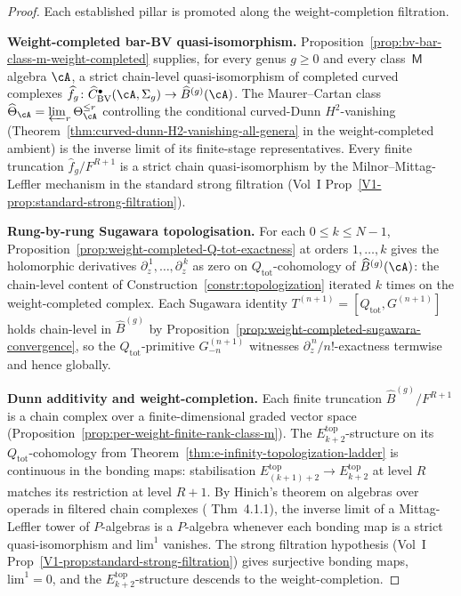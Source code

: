 \begin{proof}
Each established pillar is promoted along the weight-completion
filtration.

\smallskip\noindent
\textbf{Weight-completed bar-BV quasi-isomorphism.}
Proposition~\ref{prop:bv-bar-class-m-weight-completed} supplies, for
every genus $g \ge 0$ and every class~$\mathsf{M}$ algebra $\cA$, a
strict chain-level quasi-isomorphism of completed curved complexes
$\widehat{f}_g \colon \widehat{C}^{\bullet}_{\mathrm{BV}}(\cA, \Sigma_g)
\to \widehat{B}^{(g)}(\cA)$. The Maurer--Cartan class
$\widehat{\Theta}_\cA = \varprojlim_r \Theta_\cA^{\le r}$ controlling
the conditional curved-Dunn \(H^2\)-vanishing
(Theorem~\ref{thm:curved-dunn-H2-vanishing-all-genera} in the
weight-completed ambient) is the inverse limit of its finite-stage
representatives. Every finite truncation
$\widehat{f}_g / F^{R + 1}$ is a strict chain quasi-isomorphism by
the Milnor--Mittag-Leffler mechanism in the standard strong filtration
(Vol~I Prop~\ref{V1-prop:standard-strong-filtration}).

\smallskip\noindent
\textbf{Rung-by-rung Sugawara topologisation.}
For each $0 \le k \le N - 1$,
Proposition~\ref{prop:weight-completed-Q-tot-exactness} at orders
$1, \ldots, k$ gives the holomorphic derivatives
$\partial_z^{\,1}, \ldots, \partial_z^{\,k}$ as zero on
$Q_{\mathrm{tot}}$-cohomology of $\widehat{B}^{(g)}(\cA)$: the
chain-level content of Construction~\ref{constr:topologization}
iterated $k$ times on the weight-completed complex. Each Sugawara
identity $T^{(n+1)} = [Q_{\mathrm{tot}}, G^{(n+1)}]$ holds
chain-level in $\widehat{B}^{(g)}$ by
Proposition~\ref{prop:weight-completed-sugawara-convergence}, so the
$Q_{\mathrm{tot}}$-primitive $G^{(n+1)}_{-n}$ witnesses
$\partial_z^{\,n}/n!$-exactness termwise and hence globally.

\smallskip\noindent
\textbf{Dunn additivity and weight-completion.}
Each finite truncation $\widehat{B}^{(g)} / F^{R + 1}$ is a chain
complex over a finite-dimensional graded vector space
(Proposition~\ref{prop:per-weight-finite-rank-class-m}). The
$E_{k+2}^{\mathrm{top}}$-structure on its $Q_{\mathrm{tot}}$-cohomology
from Theorem~\ref{thm:e-infinity-topologization-ladder} is continuous
in the bonding maps: stabilisation $E_{(k+1)+2}^{\mathrm{top}} \to
E_{k+2}^{\mathrm{top}}$ at level $R$ matches its restriction at level
$R + 1$. By Hinich's theorem on algebras over operads in filtered
chain complexes (\cite{Hin15} Thm~4.1.1), the inverse limit of a
Mittag-Leffler tower of $P$-algebras is a $P$-algebra whenever each
bonding map is a strict quasi-isomorphism and $\mathrm{lim}^1$
vanishes. The strong filtration hypothesis (Vol~I
Prop~\ref{V1-prop:standard-strong-filtration}) gives surjective
bonding maps, $\mathrm{lim}^1 = 0$, and the
$E_{k+2}^{\mathrm{top}}$-structure descends to the weight-completion.


\end{proof}
